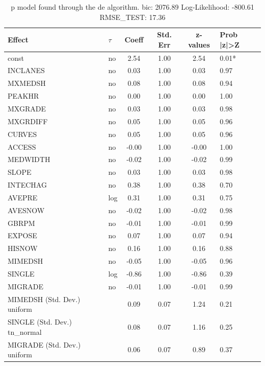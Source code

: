 \begin{table}
	\caption{p model found through the de algorithm. bic: 2076.89 Log-Likelihood: -800.61 RMSE_TEST: 17.36}
	\begin{center}
		\begin{tabular}{|l|l|c|c|c|l|}
			\hline
			Effect & $\tau$ & Coeff & Std. Err & z-values & Prob |z|>Z \\
			\hline
			const & no & 2.54 & 1.00 & 2.54 & 0.01* \\
			\hline
			INCLANES & no & 0.03 & 1.00 & 0.03 & 0.97 \\
			\hline
			MXMEDSH & no & 0.08 & 1.00 & 0.08 & 0.94 \\
			\hline
			PEAKHR & no & 0.00 & 1.00 & 0.00 & 1.00 \\
			\hline
			MXGRADE & no & 0.03 & 1.00 & 0.03 & 0.98 \\
			\hline
			MXGRDIFF & no & 0.05 & 1.00 & 0.05 & 0.96 \\
			\hline
			CURVES & no & 0.05 & 1.00 & 0.05 & 0.96 \\
			\hline
			ACCESS & no & -0.00 & 1.00 & -0.00 & 1.00 \\
			\hline
			MEDWIDTH & no & -0.02 & 1.00 & -0.02 & 0.99 \\
			\hline
			SLOPE & no & 0.03 & 1.00 & 0.03 & 0.98 \\
			\hline
			INTECHAG & no & 0.38 & 1.00 & 0.38 & 0.70 \\
			\hline
			AVEPRE & log & 0.31 & 1.00 & 0.31 & 0.75 \\
			\hline
			AVESNOW & no & -0.02 & 1.00 & -0.02 & 0.98 \\
			\hline
			GBRPM & no & -0.01 & 1.00 & -0.01 & 0.99 \\
			\hline
			EXPOSE & no & 0.07 & 1.00 & 0.07 & 0.94 \\
			\hline
			HISNOW & no & 0.16 & 1.00 & 0.16 & 0.88 \\
			\hline
			MIMEDSH & no & -0.05 & 1.00 & -0.05 & 0.96 \\
			\hline
			SINGLE & log & -0.86 & 1.00 & -0.86 & 0.39 \\
			\hline
			MIGRADE & no & -0.01 & 1.00 & -0.01 & 0.99 \\
			\hline
			MIMEDSH (Std. Dev.) uniform &  & 0.09 & 0.07 & 1.24 & 0.21 \\
			\hline
			SINGLE (Std. Dev.) tn_normal &  & 0.08 & 0.07 & 1.16 & 0.25 \\
			\hline
			MIGRADE (Std. Dev.) uniform &  & 0.06 & 0.07 & 0.89 & 0.37 \\
			\hline
		\end{tabular}
	\end{center}
\end{table}